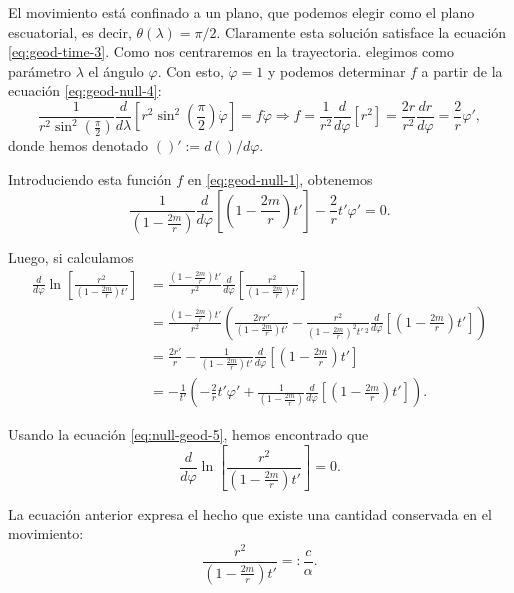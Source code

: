 \documentclass[letterpaper,11pt]{article}
\begin{document}
El movimiento está confinado a un plano, que podemos elegir como el plano escuatorial, es decir, $\theta(\lambda) = \pi/2$. Claramente esta solución satisface la ecuación \eqref{eq:geod-time-3}. Como nos centraremos en la trayectoria. elegimos como parámetro $\lambda$ el ángulo $\varphi$. Con esto, $\dot{\varphi} = 1$ y podemos determinar $f$ a partir de la ecuación \eqref{eq:geod-null-4}:
\begin{equation}
\frac{1}{r^2\sin^2\left(\frac{\pi}{2}\right)} \frac{d}{d\lambda} \left[r^2\sin^2\left(\frac{\pi}{2}\right) \dot{\varphi} \right] = f \dot{\varphi} \Rightarrow f = \frac{1}{r^2} \frac{d}{d\varphi}[r^2] = \frac{2r}{r^2} \frac{dr}{d\varphi} = \frac{2}{r} \varphi',
\end{equation}
donde hemos denotado $()':=d()/d\varphi$.

Introduciendo esta función $f$ en \eqref{eq:geod-null-1}, obtenemos 
\begin{equation}
\frac{1}{\left(1 - \frac{2m}{r}\right)} \frac{d}{d\varphi}\left[\left( 1 - \frac{2m}{r} \right) t'\right] - \frac{2}{r} t' \varphi' = 0. \label{eq:null-geod-5}
\end{equation}

Luego, si calculamos
\begin{align}
\frac{d}{d\varphi}\ln\left[ \frac{r^2}{\left( 1 - \frac{2m}{r}\right)t'} \right] &= \frac{\left( 1 - \frac{2m}{r}\right)t'}{r^2} \frac{d}{d\varphi}\left[ \frac{r^2}{\left( 1 - \frac{2m}{r}\right)t'} \right] \nonumber\\
&= \frac{\left( 1 - \frac{2m}{r}\right)t'}{r^2} \left( \frac{2r r'}{\left( 1 - \frac{2m}{r}\right)t'} - \frac{r^2}{\left( 1 - \frac{2m}{r}\right)^2 t'\,^2} \frac{d}{d\varphi} \left[\left( 1 - \frac{2m}{r} \right)t' \right] \right) \nonumber\\
&= \frac{2r'}{r} - \frac{1}{\left( 1 - \frac{2m}{r} \right)t'} \frac{d}{d\varphi} \left[\left( 1 - \frac{2m}{r} \right)t' \right]\nonumber \\
&= - \frac{1}{t'} \left( - \frac{2}{r} t' \varphi' +  \frac{1}{\left(1 - \frac{2m}{r}\right)} \frac{d}{d\varphi}\left[\left( 1 - \frac{2m}{r} \right) t'\right]\right).
\end{align}

Usando la ecuación \eqref{eq:null-geod-5}, hemos encontrado que
\begin{equation}
\frac{d}{d\varphi}\ln\left[ \frac{r^2}{\left( 1 - \frac{2m}{r}\right)t'} \right] = 0.
\end{equation}

La ecuación anterior expresa el hecho que existe una cantidad conservada en el movimiento:
\begin{equation} \label{eq:conserved-quantity}
\frac{r^2}{\left( 1 - \frac{2m}{r}\right)t'} =: \frac{c}{\alpha}.
\end{equation}
\end{document}
